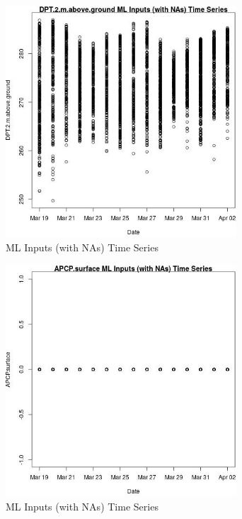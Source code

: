 \begin{figure} 
\centering  
\includegraphics[width=0.77\textwidth]{Code_Outputs/Report_ML_input_PM25_Step4_part_e_de_duplicated_aveswNAs_DPT2mabovegroundvDate.jpg} 
\caption{\label{fig:Report_ML_input_PM25_Step4_part_e_de_duplicated_aveswNAsDPT2mabovegroundvDate}ML Inputs (with NAs) Time Series} 
\end{figure} 
 

\begin{figure} 
\centering  
\includegraphics[width=0.77\textwidth]{Code_Outputs/Report_ML_input_PM25_Step4_part_e_de_duplicated_aveswNAs_APCPsurfacevDate.jpg} 
\caption{\label{fig:Report_ML_input_PM25_Step4_part_e_de_duplicated_aveswNAsAPCPsurfacevDate}ML Inputs (with NAs) Time Series} 
\end{figure} 
 

